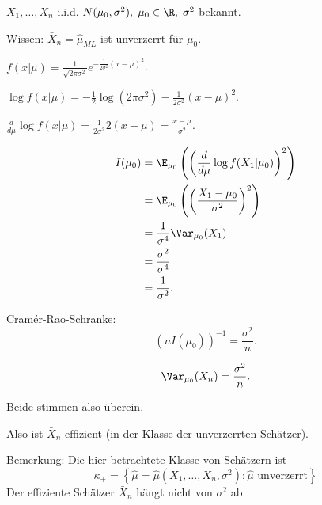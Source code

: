 \documentclass{tstextbook}
\begin{document}
\begin{example}
	$ X_1,\ldots,X_n $ i.i.d. $ N(\mu_0,\sigma^2), \; \mu_0 \in \R,\; \sigma^2 $ bekannt.
	
	Wissen: $ \bar{X}_n = \hat{\mu}_{ML} $ ist unverzerrt für $ \mu_0 $. 
	
	$ f(x|\mu) = \frac{1}{\sqrt{2\pi\sigma^2}} e^{-\frac{1}{2\sigma^2}(x-\mu)^2} $. 
	
	$ \log f(x|\mu) = -\frac{1}{2}\log(2\pi\sigma^2)-\frac{1}{2\sigma^2}(x-\mu)^2 $. 
	
	$ \frac{d}{d\mu}\log f(x|\mu) = \frac{1}{2\sigma^2}2(x-\mu) = \frac{x-\mu}{\sigma^2} $.
	
	\[
	\begin{aligned}
		I(\mu_0) & = \E_{\mu_0} \left(\left(\frac{d}{d\mu}\log f(X_1|\mu_0)\right)^2\right) \\
		& = \E_{\mu_0}\left(\left(\frac{X_1-\mu_0}{\sigma^2}\right)^2\right) \\
		& = \frac{1}{\sigma^4}\Var_{\mu_0}(X_1) \\
		& = \frac{\sigma^2}{\sigma^4} \\
		& = \frac{1}{\sigma^2}. 
	\end{aligned}
	\]
	
	Cramér-Rao-Schranke:
	\[
	(nI(\mu_0))^{-1} = \frac{\sigma^2}{n}.
	\]
	
	\[ \Var_{\mu_0}(\bar{X}_n) = \frac{\sigma^2}{n} . 
	\]
	
	Beide stimmen also überein. 
	
	Also ist $ \bar{X}_n $ effizient (in der Klasse der unverzerrten Schätzer).
\end{example}

\begin{remark}
	Bemerkung:
	Die hier betrachtete Klasse von Schätzern ist 
	\[
	\kappa_+ = \left\lbrace \hat{\mu} = \hat{\mu}(X_1,\ldots,X_n, \sigma^2) \colon \hat{\mu} \text{ unverzerrt}\right\rbrace
	\]
	Der effiziente Schätzer $ \bar{X}_n $ hängt nicht von $ \sigma^2 $ ab.
\end{remark}
\end{document}
